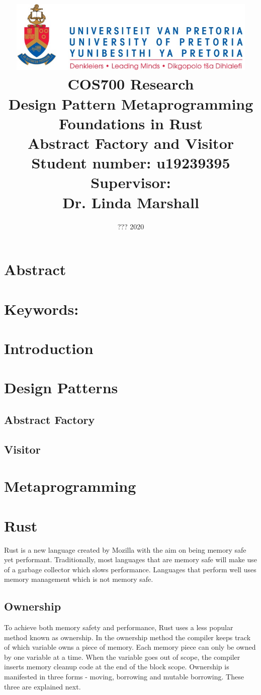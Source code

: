 \documentclass[a4paper,10pt]{article}
\title
{
   \includegraphics[width=12cm]{up_logo.png} \\
   \vspace{2cm}
   \textbf{COS700 Research} \\ \vspace{0.5cm}
   \textbf{Design Pattern Metaprogramming Foundations in Rust\\ \large Abstract Factory and Visitor} \\ \vspace{0.5cm}
   \textbf{Student number:} u19239395 \\ \vspace{0.5cm}
   \textbf{Supervisor}: \\ Dr. Linda Marshall
}
\date{??? 2020}
\begin{document}
\author{}

\maketitle

\newpage
\linespread{1.25}

\section*{Abstract}

\section*{Keywords:}

\newpage

\section{Introduction}

\section{Design Patterns}

\subsection{Abstract Factory}

\subsection{Visitor}

\section{Metaprogramming}

\section{Rust}
Rust is a new language created by Mozilla with the aim on being memory safe yet performant. Traditionally, most languages that are memory safe will make use of a garbage collector which slows performance. Languages that perform well uses memory management which is not memory safe.

\subsection{Ownership}
To achieve both memory safety and performance, Rust uses a less popular method known as ownership. In the ownership method the compiler keeps track of which variable owns a piece of memory. Each memory piece can only be owned by one variable at a time. When the variable goes out of scope, the compiler inserts memory cleanup code at the end of the block scope. Ownership is manifested in three forms - moving, borrowing and mutable borrowing. These three are explained next.
\end{document}
